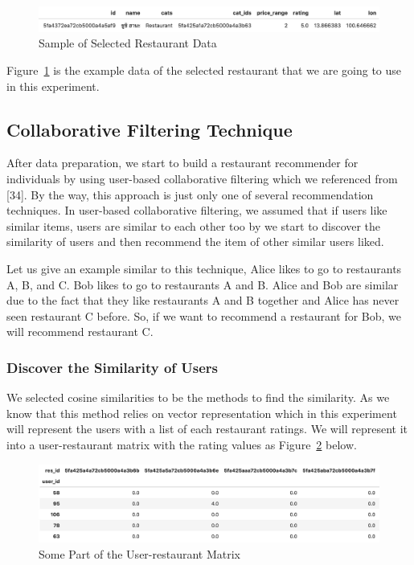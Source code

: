 \documentclass[12pt,oneside,openright,a4paper]{cpe-english-project}
\begin{document}
\begin{figure}[H]\centering
\includegraphics[width=350pt]{./images/4SampleofSelectedRestaurantData.png}
\caption{Sample of Selected Restaurant Data}\label{fig:4SampleofSelectedRestaurantData}
\end{figure}\vspace{-24pt}

Figure~\ref{fig:4SampleofSelectedRestaurantData} is the example data of the selected restaurant that we are going to use in this experiment.

\subsection{Collaborative Filtering Technique}

After data preparation, we start to build a restaurant recommender for individuals by using user-based collaborative filtering which we referenced from [34]. By the way, this approach is just only one of several recommendation techniques. In user-based collaborative filtering, we assumed that if users like similar items, users are similar to each other too by we start to discover the similarity of users and then recommend the item of other similar users liked.

Let us give an example similar to this technique, Alice likes to go to restaurants A, B, and C. Bob likes to go to restaurants A and B. Alice and Bob are similar due to the fact that they like restaurants A and B together and Alice has never seen restaurant C before. So, if we want to recommend a restaurant for Bob, we will recommend restaurant C.

\subsubsection{Discover the Similarity of Users}

We selected cosine similarities to be the methods to find the similarity. As we know that this method relies on vector representation which in this experiment will represent the users with a list of each restaurant ratings. We will represent it into a user-restaurant matrix with the rating values as Figure~\ref{fig:4SomePartoftheUserrestaurantMatrix} below.

\begin{figure}[H]\centering
\includegraphics[width=350pt]{./images/4SomePartoftheUserrestaurantMatrix.png}
\caption{Some Part of the User-restaurant Matrix}\label{fig:4SomePartoftheUserrestaurantMatrix}
\end{figure}\vspace{-24pt}
\end{document}
